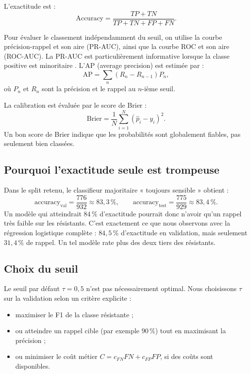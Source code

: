 \documentclass[11pt,a4paper]{article}
\begin{document}
L'exactitude est :
\[
\text{Accuracy} = \frac{TP+TN}{TP+TN+FP+FN}.
\]

Pour évaluer le classement indépendamment du seuil, on utilise la courbe précision-rappel et son aire (PR-AUC), ainsi que la courbe ROC et son aire (ROC-AUC). La PR-AUC est particulièrement informative lorsque la classe positive est minoritaire \citep{saito2015}. L'AP (average precision) est estimée par :
\[
\text{AP} = \sum_{n} (R_n - R_{n-1}) P_n,
\]
où \(P_n\) et \(R_n\) sont la précision et le rappel au \(n\)-ième seuil.

La calibration est évaluée par le score de Brier :
\[
\text{Brier} = \frac{1}{N}\sum_{i=1}^N (\hat p_i - y_i)^2.
\]
Un bon score de Brier indique que les probabilités sont globalement fiables, pas seulement bien classées.

\subsection{Pourquoi l'exactitude seule est trompeuse}

Dans le split retenu, le classifieur majoritaire « toujours sensible » obtient :
\[
\text{accuracy}_{\text{val}} = \frac{776}{932} \approx 83{,}3\,\%,
\qquad
\text{accuracy}_{\text{test}} = \frac{775}{929} \approx 83{,}4\,\%.
\]
Un modèle qui atteindrait $84\,\%$ d'exactitude pourrait donc n'avoir qu'un rappel très faible sur les résistants. C'est exactement ce que nous observons avec la régression logistique complète : $84{,}5\,\%$ d'exactitude en validation, mais seulement $31{,}4\,\%$ de rappel. Un tel modèle rate plus des deux tiers des résistants.

\subsection{Choix du seuil}

Le seuil par défaut $\tau = 0{,}5$ n'est pas nécessairement optimal. Nous choisissons \(\tau\) sur la validation selon un critère explicite :
\begin{itemize}[leftmargin=1.2em]
    \item maximiser le F1 de la classe résistante ;
    \item ou atteindre un rappel cible (par exemple $90\,\%$) tout en maximisant la précision ;
    \item ou minimiser le coût métier \(C = c_{FN} FN + c_{FP} FP\), si des coûts sont disponibles.
\end{itemize}
\end{document}
